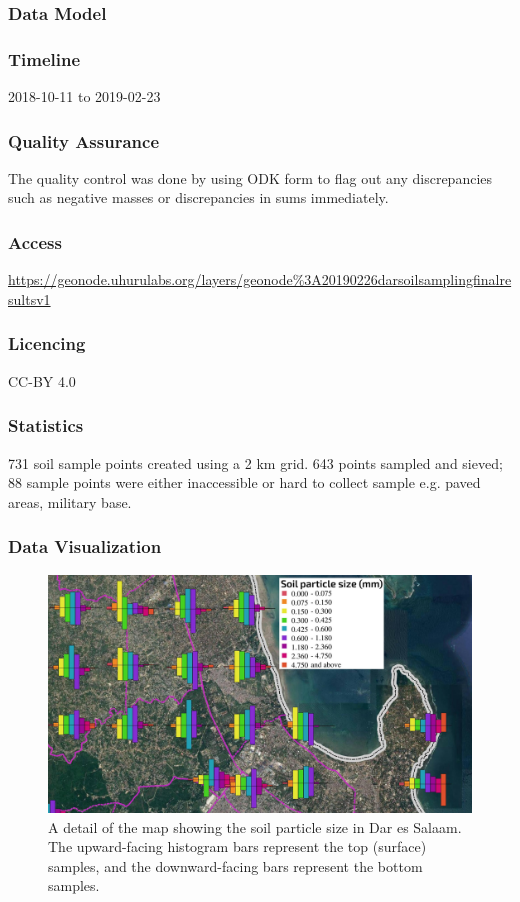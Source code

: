 \documentclass[a4paper,12pt,twoside]{article}
\begin{document}
\subsubsection{Data Model}

\subsubsection{Timeline}
2018-10-11 to 2019-02-23

\subsubsection{Quality Assurance}

The quality control was done by  using ODK form to flag out any discrepancies such as negative masses or discrepancies in sums immediately.

\subsubsection{Access}
\href{https://geonode.uhurulabs.org/layers/geonode\%3A_2019_02_26_dar_soil_sampling_final_results_v1}{https://geonode.uhurulabs.org/layers/geonode\%3A20190226darsoilsamplingfinalresultsv1}

\subsubsection{Licencing}
CC-BY 4.0

\subsubsection{Statistics}
731 soil sample points created using a 2 km grid. 643 points sampled and sieved; 88 sample points were either inaccessible or hard to collect sample e.g. paved areas, military base.

\subsubsection{Data Visualization}
\begin{figure}[h]
  \color{RHgreen}\caption{A detail of the map showing the soil particle size in Dar es Salaam. The upward-facing histogram bars represent the top (surface) samples, and the downward-facing bars represent the bottom samples.}
  \centering
  \includegraphics[width=1\textwidth]{soil_map_detail_peninsula_with_legend}
\end{figure}
\end{document}

